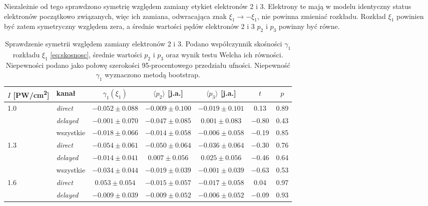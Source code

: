 \documentclass[12pt,a4paper]{article}
\newcommand{\ja}{j.a.}
\newcommand{\PWcm}{PW/cm\textsuperscript{2}}
\begin{document}
Niezależnie od tego sprawdzono symetrię względem zamiany etykiet
elektronów 2 i 3. Elektrony te mają w modelu identyczny status elektronów początkowo związanych, więc
ich zamiana, odwracająca znak $\xi_1\rightarrow-\xi_1$, nie powinna
zmieniać rozkładu. Rozkład $\xi_1$ powinien być zatem symetryczny
względem zera, a średnie wartości pędów elektronów 2 i 3 $p_2$ i $p_3$ powinny być równe. 

\begin{table}[htbp]
  \centering
  \small
  \caption{Sprawdzenie symetrii względem zamiany elektronów 2 i 3.
  Podano współczynnik skośności $\gamma_1$ rozkładu $\xi_1$
  \eqref{eq:skosnosc}, średnie wartości $p_2$ i $p_3$ oraz wynik testu
  Welcha ich równości. Niepewności podano jako połowę szerokości 95-procentowego
  przedziału ufności. Niepewność $\gamma_1$
  wyznaczono metodą bootstrap.}
  \label{tab:symetria}
  \begin{tabular}{llccccc}
    \toprule
    $I$ [\PWcm] & kanał & $\gamma_1(\xi_1)$ & $\langle p_2\rangle$ [\ja]
      & $\langle p_3\rangle$ [\ja] & $t$ & $p$ \\
    \midrule
    \num{1.0} & \emph{direct}  & $\num{-0.052}\pm\num{0.088}$ & $\num{-0.009}\pm\num{0.100}$ & $\num{-0.019}\pm\num{0.101}$ & \num{0.13} & \num{0.89} \\
              & \emph{delayed} & $\num{-0.001}\pm\num{0.070}$ & $\num{-0.047}\pm\num{0.085}$ & $\num{0.001}\pm\num{0.083}$ & \num{-0.80} & \num{0.43} \\
              & wszystkie      & $\num{-0.018}\pm\num{0.066}$ & $\num{-0.014}\pm\num{0.058}$ & $\num{-0.006}\pm\num{0.058}$ & \num{-0.19} & \num{0.85} \\
    \midrule
    \num{1.3} & \emph{direct}  & $\num{-0.054}\pm\num{0.061}$ & $\num{-0.050}\pm\num{0.064}$ & $\num{-0.036}\pm\num{0.064}$ & \num{-0.30} & \num{0.76} \\
              & \emph{delayed} & $\num{-0.014}\pm\num{0.041}$ & $\num{0.007}\pm\num{0.056}$ & $\num{0.025}\pm\num{0.056}$ & \num{-0.46} & \num{0.64} \\
              & wszystkie      & $\num{-0.034}\pm\num{0.044}$ & $\num{-0.019}\pm\num{0.039}$ & $\num{-0.001}\pm\num{0.039}$ & \num{-0.63} & \num{0.53} \\
    \midrule
    \num{1.6} & \emph{direct}  & $\num{0.053}\pm\num{0.054}$ & $\num{-0.015}\pm\num{0.057}$ & $\num{-0.017}\pm\num{0.058}$ & \num{0.04} & \num{0.97} \\
              & \emph{delayed} & $\num{-0.009}\pm\num{0.039}$ & $\num{-0.009}\pm\num{0.052}$ & $\num{-0.006}\pm\num{0.052}$ & \num{-0.09} & \num{0.93} \\

\end{tabular}
\end{table}
\end{document}
